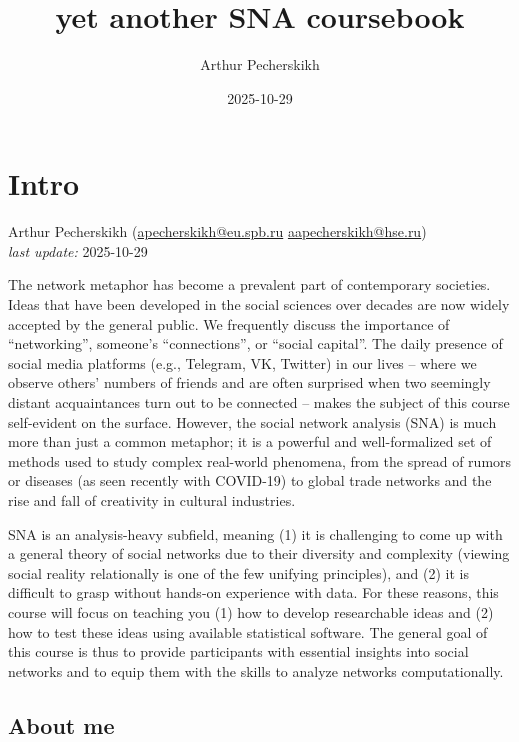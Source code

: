 \documentclass[
]{book}
\title{yet another SNA coursebook}
\author{Arthur Pecherskikh}
\date{2025-10-29}
\begin{document}
\maketitle

{
\setcounter{tocdepth}{1}
\tableofcontents
}
\chapter*{\texorpdfstring{\textbf{Intro}}{Intro}}\label{intro}

Arthur Pecherskikh (\href{aapecherskikh@eu.spb.ru}{apecherskikh@eu.spb.ru} \textbar{} \url{aapecherskikh@hse.ru})\\
\emph{last update:} 2025-10-29

The network metaphor has become a prevalent part of contemporary societies. Ideas that have been developed in the social sciences over decades are now widely accepted by the general public. We frequently discuss the importance of ``networking'', someone's ``connections'', or ``social capital''. The daily presence of social media platforms (e.g., Telegram, VK, Twitter) in our lives -- where we observe others' numbers of friends and are often surprised when two seemingly distant acquaintances turn out to be connected -- makes the subject of this course self-evident on the surface. However, the social network analysis (SNA) is much more than just a common metaphor; it is a powerful and well-formalized set of methods used to study complex real-world phenomena, from the spread of rumors or diseases (as seen recently with COVID-19) to global trade networks and the rise and fall of creativity in cultural industries.

SNA is an analysis-heavy subfield, meaning (1) it is challenging to come up with a general theory of social networks due to their diversity and complexity (viewing social reality relationally is one of the few unifying principles), and (2) it is difficult to grasp without hands-on experience with data. For these reasons, this course will focus on teaching you (1) how to develop researchable ideas and (2) how to test these ideas using available statistical software. The general goal of this course is thus to provide participants with essential insights into social networks and to equip them with the skills to analyze networks computationally.

\section*{\texorpdfstring{\textbf{About me}}{About me}}\label{about-me}
\end{document}
